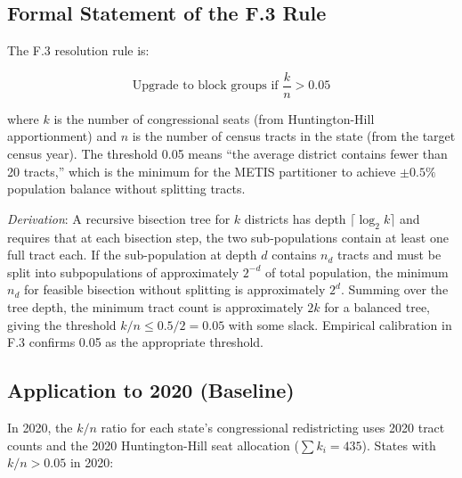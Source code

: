 \label{sec:resolution-rule}

\subsection{Formal Statement of the F.3 Rule}

The F.3 resolution rule is:

\begin{equation}
\text{Upgrade to block groups if } \frac{k}{n} > 0.05
\label{eq:resolution-rule}
\end{equation}

where $k$ is the number of congressional seats (from Huntington-Hill apportionment)
and $n$ is the number of census tracts in the state (from the target census year).
The threshold 0.05 means ``the average district contains fewer than 20 tracts,''
which is the minimum for the METIS partitioner to achieve $\pm0.5\%$ population
balance without splitting tracts.

\textit{Derivation}: A recursive bisection tree for $k$ districts has depth
$\lceil \log_2 k \rceil$ and requires that at each bisection step, the two
sub-populations contain at least one full tract each. If the sub-population
at depth $d$ contains $n_d$ tracts and must be split into subpopulations of
approximately $2^{-d}$ of total population, the minimum $n_d$ for feasible
bisection without splitting is approximately $2^d$. Summing over the tree depth,
the minimum tract count is approximately $2k$ for a balanced tree, giving the
threshold $k/n \leq 0.5/2 = 0.05$ with some slack. Empirical calibration
in F.3 confirms 0.05 as the appropriate threshold.

\subsection{Application to 2020 (Baseline)}

In 2020, the $k/n$ ratio for each state's congressional redistricting uses 2020
tract counts and the 2020 Huntington-Hill seat allocation ($\sum k_i = 435$).
States with $k/n > 0.05$ in 2020:

